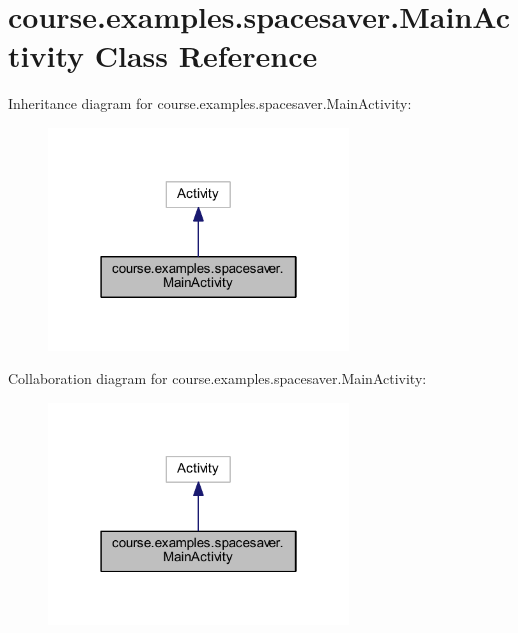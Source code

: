 \hypertarget{classcourse_1_1examples_1_1spacesaver_1_1_main_activity}{}\section{course.\+examples.\+spacesaver.\+Main\+Activity Class Reference}
\label{classcourse_1_1examples_1_1spacesaver_1_1_main_activity}


Inheritance diagram for course.\+examples.\+spacesaver.\+Main\+Activity\+:
\nopagebreak
\begin{figure}[H]
\begin{center}
\leavevmode
\includegraphics[width=226pt]{classcourse_1_1examples_1_1spacesaver_1_1_main_activity__inherit__graph}
\end{center}
\end{figure}


Collaboration diagram for course.\+examples.\+spacesaver.\+Main\+Activity\+:
\nopagebreak
\begin{figure}[H]
\begin{center}
\leavevmode
\includegraphics[width=226pt]{classcourse_1_1examples_1_1spacesaver_1_1_main_activity__coll__graph}
\end{center}
\end{figure}
